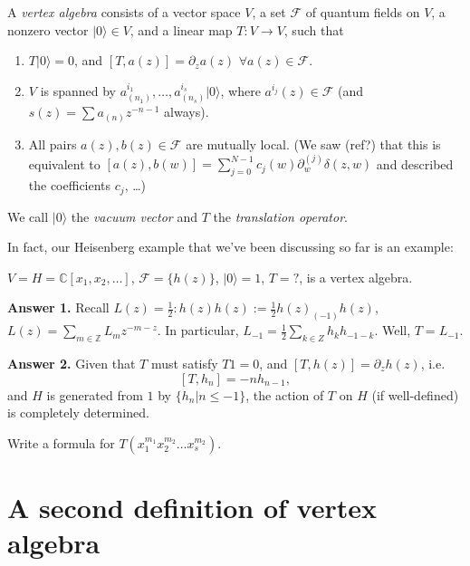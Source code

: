 \begin{definition}
\label{definition-vertex-algebra}
A {\it vertex algebra} consists of a vector space $V$,
a set $\mathcal{F}$ of quantum fields on $V$,
a nonzero vector $|0\rangle\in V$,
and a linear map $T:V \to V$,
such that
\begin{enumerate}
\item $T|0\rangle=0$, and $[T,a(z)]=\partial_za(z)$ 
$\forall a(z) \in \mathcal{F}$.
\item $V$ is spanned by $a_{(n_1)}^{i_1},\ldots,a_{(n_s)}^{i_s}|0\rangle$,
where $a^{i_j}(z) \in \mathcal{F}$ (and 
$s(z)=\sum a_{(n)}z^{-n-1}$ always).
\item All pairs $a(z),b(z) \in \mathcal{F}$ are mutually local. 
(We saw (ref?) that this is equivalent to 
$[a(z),b(w)]=\sum_{j=0}^{N-1}c_j(w)\partial_w^{(j)}\delta(z,w)$ and
described the coefficients $c_j$, …)
\end{enumerate}
\end{definition}

We call $|0\rangle$ the {\it vacuum vector} and $T$ the {\it translation
operator}.

In fact, our Heisenberg example that we've been discussing
so far is an example:

\begin{example}
\label{example-Heisenberg-is-vertex-algebra}
$V=H=\mathbb{C}[x_1,x_2,\ldots]$,
$\mathcal{F}=\{h(z)\}$, $|0\rangle=1$, $T=?$,
is a vertex algebra.

\noindent
{\bf Answer 1.} Recall $L(z)=\frac{1}{2}:\!h(z)h(z)\!:=
\frac{1}{2}h(z)_{(-1)}h(z)$, $L(z)=\sum_{m \in \mathbb{Z}}L_mz^{-m-z}$.
In particular, $L_{-1}=\frac{1}{2}\sum_{k \in Z}h_kh_{-1-k}$.
Well, $T=L_{-1}$.

\noindent
{\bf Answer 2.} Given that $T$ must satisfy
$T1=0$, and $[T,h(z)]=\partial_zh(z)$, i.e.
$$
[T,h_n]=-nh_{n-1},
$$
and $H$ is generated from $1$ by $\{h_n|n\leq -1\}$,
the action of $T$ on $H$ (if well-defined) is
completely determined.
\end{example}

\begin{exercise}
\label{exercise-write-a-formula}
Write a formula for $T(x_1^{m_1}x_2^{m_2}\ldots x_s^{m_2})$.
\end{exercise}

\section{A second definition of vertex algebra}
\label{section-second-definition-of-vertex-algebra}

